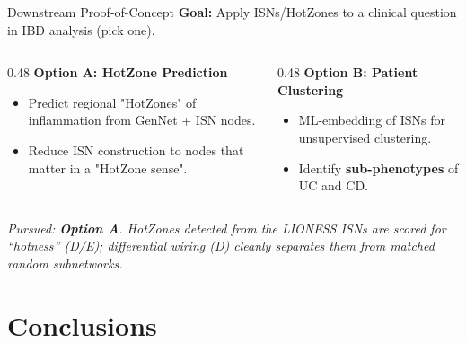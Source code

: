 \documentclass[aspectratio=169]{beamer}
\begin{document}
\begin{frame}{Downstream Proof-of-Concept}
	\textbf{Goal:} Apply ISNs/HotZones to a clinical question in IBD analysis (pick one).

	\vspace{0.3cm}
	\begin{columns}[T]
		\begin{column}{0.48\textwidth}
			\textbf{Option A: HotZone Prediction}
			\begin{itemize}
				\item Predict regional "HotZones" of inflammation from GenNet + ISN nodes.
				\item Reduce ISN construction to nodes that matter in a "HotZone sense".
			\end{itemize}
		\end{column}
		\begin{column}{0.48\textwidth}
			\textbf{Option B: Patient Clustering}
			\begin{itemize}
				\item ML-embedding of ISNs for unsupervised clustering.
				\item Identify \textbf{sub-phenotypes} of UC and CD.
			\end{itemize}
		\end{column}
	\end{columns}
	\vspace{0.4cm}
	\centering\footnotesize
	\textit{Pursued: \textbf{Option A}. HotZones detected from the LIONESS ISNs are scored for ``hotness''
	(D/E); differential wiring (D) cleanly separates them from matched random subnetworks.}
\end{frame}

\section{Conclusions}
\end{document}
